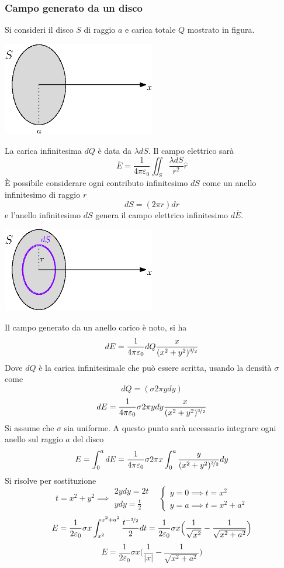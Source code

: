 \documentclass[10pt, letterpaper]{report}
\begin{document}
\subsubsection{Campo generato da un disco}
Si consideri il disco $S$ di raggio $a$ e carica  totale $Q$ mostrato in figura.\begin{center}
    \includegraphics[width=0.5\textwidth]{images/discoCarico.eps}
\end{center}
La carica infinitesima $dQ$ è data da $\lambda dS$. Il campo elettrico sarà 
$$ \bar E = \frac{1}{4\pi\varepsilon_0}\iint_S \frac{\lambda dS}{r^2}\hat r $$
È possibile considerare ogni contributo infinitesimo $dS$ come un anello infinitesimo di raggio 
$r$
$$ dS=(2\pi r)dr$$
e l'anello infinitesimo $dS$ genera il campo elettrico infinitesimo $d\bar E$.
\begin{center}
    \includegraphics[width=0.5\textwidth]{images/discoCarico2.eps}
\end{center}
Il campo generato da un anello carico è noto, si ha 
$$ dE=\frac{1}{4\pi\varepsilon_0}dQ\frac{x}{(x^2+y^2)^{\nicefrac{3}{2}}}$$
Dove $dQ$ è la carica infinitesimale che può essere scritta, usando la densità $\sigma$ come 
$$ dQ=(\sigma 2\pi ydy)$$
$$ dE=\frac{1}{4\pi\varepsilon_0}\sigma 2\pi ydy \frac{x}{(x^2+y^2)^{\nicefrac{3}{2}}}$$
Si assume che $\sigma$ sia uniforme. A questo punto sarà necessario integrare ogni anello sul raggio 
$a$ del disco 
$$E=\int_0^a dE = \frac{1}{4\pi\varepsilon_0}\sigma 2\pi x \int_0^a \frac{y}{(x^2+y^2)^{\nicefrac{3}{2}}}dy $$
Si risolve per sostituzione 
$$ t=x^2+y^2 \implies \begin{matrix}
    2ydy=2t \\ ydy=\frac{t}{2}
\end{matrix} \ \ \ \ \begin{cases}
    y=0\implies t=x^2 \\ 
    y=a\implies t = x^2+a^2
\end{cases}$$
$$E= \frac{1}{2\varepsilon_0}\sigma x \int_{x^2}^{x^2+a^2}\frac{t^{-\nicefrac{3}{2}}}{2}dt = 
\frac{1}{2\varepsilon_0}\sigma x\Big( \frac{1}{\sqrt{x^2}}-\frac{1}{\sqrt{x^2+a^2}} \Big)
$$
$$ E=\frac{1}{2\varepsilon_0}\sigma x\Big( \frac{1}{|x|}-\frac{1}{\sqrt{x^2+a^2}} \Big)$$
\end{document}
